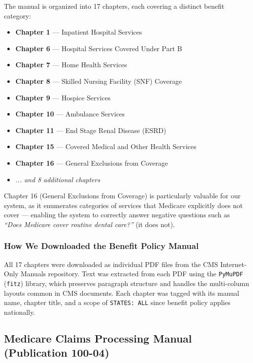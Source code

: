 \documentclass[10pt, letterpaper]{article}
\begin{document}
The manual is organized into 17 chapters, each covering a distinct benefit category:
 
\begin{itemize}[noitemsep, topsep=4pt]
    \item \textbf{Chapter 1} --- Inpatient Hospital Services
    \item \textbf{Chapter 6} --- Hospital Services Covered Under Part B
    \item \textbf{Chapter 7} --- Home Health Services
    \item \textbf{Chapter 8} --- Skilled Nursing Facility (SNF) Coverage
    \item \textbf{Chapter 9} --- Hospice Services
    \item \textbf{Chapter 10} --- Ambulance Services
    \item \textbf{Chapter 11} --- End Stage Renal Disease (ESRD)
    \item \textbf{Chapter 15} --- Covered Medical and Other Health Services
    \item \textbf{Chapter 16} --- General Exclusions from Coverage
    \item \textit{... and 8 additional chapters}
\end{itemize}
 
Chapter 16 (General Exclusions from Coverage) is particularly valuable for our system,
as it enumerates categories of services that Medicare explicitly does not cover ---
enabling the system to correctly answer negative questions such as \textit{``Does
Medicare cover routine dental care?''} (it does not).
 
\subsubsection{How We Downloaded the Benefit Policy Manual}
 
All 17 chapters were downloaded as individual PDF files from the CMS Internet-Only
Manuals repository. Text was extracted from each PDF using the \texttt{PyMuPDF}
(\texttt{fitz}) library, which preserves paragraph structure and handles the
multi-column layouts common in CMS documents. Each chapter was tagged with its
manual name, chapter title, and a scope of \texttt{STATES: ALL} since benefit policy
applies nationally.
 
\subsection{Medicare Claims Processing Manual (Publication 100-04)}
 
\end{document}
